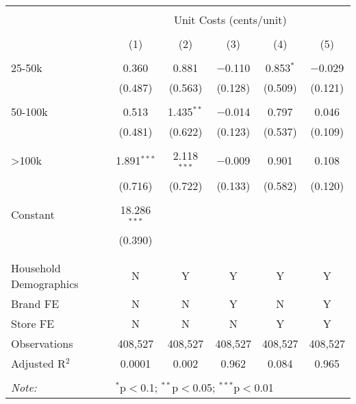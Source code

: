 
\begin{table}[!htbp] \centering 
  \caption{} 
  \label{} 
\begin{tabular}{@{\extracolsep{5pt}}lccccc} 
\\[-1.8ex]\hline 
\hline \\[-1.8ex] 
 & \multicolumn{5}{c}{Unit Costs (cents/unit)} \\ 
\cline{2-6} 
\\[-1.8ex] & (1) & (2) & (3) & (4) & (5)\\ 
\hline \\[-1.8ex] 
 25-50k & 0.360 & 0.881 & $-$0.110 & 0.853$^{*}$ & $-$0.029 \\ 
  & (0.487) & (0.563) & (0.128) & (0.509) & (0.121) \\ 
  & & & & & \\ 
 50-100k & 0.513 & 1.435$^{**}$ & $-$0.014 & 0.797 & 0.046 \\ 
  & (0.481) & (0.622) & (0.123) & (0.537) & (0.109) \\ 
  & & & & & \\ 
 >100k & 1.891$^{***}$ & 2.118$^{***}$ & $-$0.009 & 0.901 & 0.108 \\ 
  & (0.716) & (0.722) & (0.133) & (0.582) & (0.120) \\ 
  & & & & & \\ 
 Constant & 18.286$^{***}$ &  &  &  &  \\ 
  & (0.390) &  &  &  &  \\ 
  & & & & & \\ 
\hline \\[-1.8ex] 
Household Demographics & N & Y & Y & Y & Y \\ 
Brand FE & N & N & Y & N & Y \\ 
Store FE & N & N & N & Y & Y \\ 
Observations & 408,527 & 408,527 & 408,527 & 408,527 & 408,527 \\ 
Adjusted R$^{2}$ & 0.0001 & 0.002 & 0.962 & 0.084 & 0.965 \\ 
\hline 
\hline \\[-1.8ex] 
\textit{Note:}  & \multicolumn{5}{l}{$^{*}$p$<$0.1; $^{**}$p$<$0.05; $^{***}$p$<$0.01} \\ 
\end{tabular} 
\end{table} 
